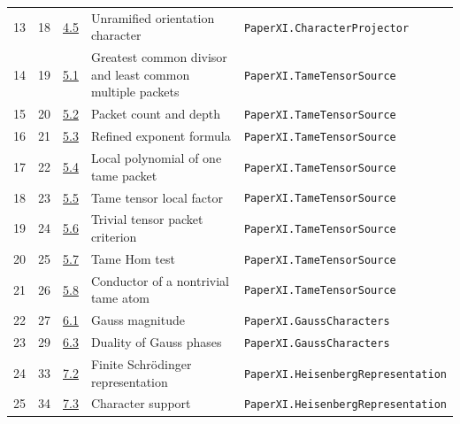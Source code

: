 \documentclass[10pt,oneside]{book}
\begin{document}
\begin{longtable}{@{}p{}p{}p{}>{\raggedright\arraybackslash}p{}p{}@{}}
13&18&\href{https://komorebi.invalid/b06/obligation_13}{4.5}&Unramified orientation character&\nolinkurl{PaperXI.CharacterProjector}\\

14&19&\href{https://komorebi.invalid/b06/obligation_14}{5.1}&Greatest common divisor and least common multiple packets&\nolinkurl{PaperXI.TameTensorSource}\\

15&20&\href{https://komorebi.invalid/b06/obligation_15}{5.2}&Packet count and depth&\nolinkurl{PaperXI.TameTensorSource}\\

16&21&\href{https://komorebi.invalid/b06/obligation_16}{5.3}&Refined exponent formula&\nolinkurl{PaperXI.TameTensorSource}\\

17&22&\href{https://komorebi.invalid/b06/obligation_17}{5.4}&Local polynomial of one tame packet&\nolinkurl{PaperXI.TameTensorSource}\\

18&23&\href{https://komorebi.invalid/b06/obligation_18}{5.5}&Tame tensor local factor&\nolinkurl{PaperXI.TameTensorSource}\\

19&24&\href{https://komorebi.invalid/b06/obligation_19}{5.6}&Trivial tensor packet criterion&\nolinkurl{PaperXI.TameTensorSource}\\

20&25&\href{https://komorebi.invalid/b06/obligation_20}{5.7}&Tame Hom test&\nolinkurl{PaperXI.TameTensorSource}\\

21&26&\href{https://komorebi.invalid/b06/obligation_21}{5.8}&Conductor of a nontrivial tame atom&\nolinkurl{PaperXI.TameTensorSource}\\

22&27&\href{https://komorebi.invalid/b06/obligation_22}{6.1}&Gauss magnitude&\nolinkurl{PaperXI.GaussCharacters}\\

23&29&\href{https://komorebi.invalid/b06/obligation_23}{6.3}&Duality of Gauss phases&\nolinkurl{PaperXI.GaussCharacters}\\

24&33&\href{https://komorebi.invalid/b06/obligation_24}{7.2}&Finite Schrödinger representation&\nolinkurl{PaperXI.HeisenbergRepresentation}\\

25&34&\href{https://komorebi.invalid/b06/obligation_25}{7.3}&Character support&\nolinkurl{PaperXI.HeisenbergRepresentation}\\


\end{longtable}
\end{document}

